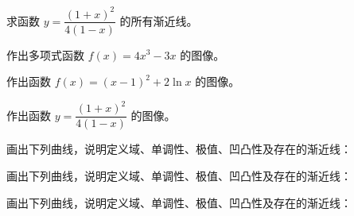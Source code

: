 \noindent\begin{minipage}{\textwidth}
求函数 $y=\dfrac{(1+x)^2}{4(1-x)}$ 的所有渐近线。
\end{minipage}\par\vfill
\noindent\begin{minipage}{\textwidth}
作出多项式函数 $f(x)=4x^3-3x$ 的图像。
\end{minipage}\par\vfill
\newpage
\noindent\begin{minipage}{\textwidth}
作出函数 $f(x)=(x-1)^2+2\ln x$ 的图像。
\end{minipage}\par\vfill
\noindent\begin{minipage}{\textwidth}
作出函数 $y=\dfrac{(1+x)^2}{4(1-x)}$ 的图像。
\end{minipage}\par\vfill
\noindent\begin{minipage}{\textwidth}
画出下列曲线，说明定义域、单调性、极值、凹凸性及存在的渐近线：
\end{minipage}\par\vfill
\newpage
\noindent\begin{minipage}{\textwidth}
画出下列曲线，说明定义域、单调性、极值、凹凸性及存在的渐近线：
\end{minipage}\par\vfill
\noindent\begin{minipage}{\textwidth}
画出下列曲线，说明定义域、单调性、极值、凹凸性及存在的渐近线：
\end{minipage}\par\vfill
